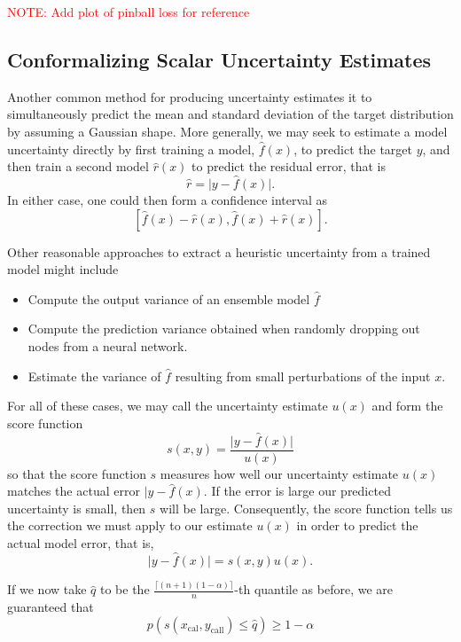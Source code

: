 \textcolor{red}{NOTE: Add plot of pinball loss for reference}

\subsection{Conformalizing Scalar Uncertainty Estimates}

Another common method for producing uncertainty estimates it to simultaneously predict the mean and standard deviation of the target distribution by assuming a Gaussian shape. More generally, we may seek to estimate a model uncertainty directly by first training a model, $\hat{f}(x)$, to predict the target $y$, and then train a second model $\hat{r}(x)$ to predict the residual error, that is
\begin{equation}
  \hat{r} = \lvert y - \hat{f}(x)\rvert.
\end{equation}
In either case, one could then form a confidence interval as
\begin{equation}
  \left[ \hat{f}(x) - \hat{r}(x), \hat{f}(x) + \hat{r}(x) \right].
\end{equation}

Other reasonable approaches to extract a heuristic uncertainty from a trained model might include
\begin{itemize}
\item Compute the output variance of an ensemble model $\hat{f}$
\item Compute the prediction variance obtained when randomly dropping out nodes from a neural network.
\item Estimate the variance of $\hat{f}$ resulting from small perturbations of the input $x$.
\end{itemize}
For all of these cases, we may call the uncertainty estimate $u(x)$ and form the score function
\begin{equation}
  s(x,y) = \frac{\lvert y - \hat{f}(x) \rvert}{u(x)}
\end{equation}
so that the score function $s$ measures how well our uncertainty estimate $u(x)$ matches the actual error $\lvert y -\hat{f}(x)$. If the error is large our predicted uncertainty is small, then $s$ will be large. Consequently, the score function tells us the correction we must apply to our estimate $u(x)$ in order to predict the actual model error, that is,
\begin{equation}
  \lvert y - \hat{f}(x) \rvert = s(x,y)u(x).
\end{equation}

If we now take $\hat{q}$ to be the $\frac{\lceil(n+1)(1-\alpha) \rceil}{n}$-th quantile as before, we are guaranteed that
\begin{equation}
  p(s(x_{\text{cal}}, y_{\text{call}}) \leq \hat{q}) \geq 1 - \alpha
\end{equation}

